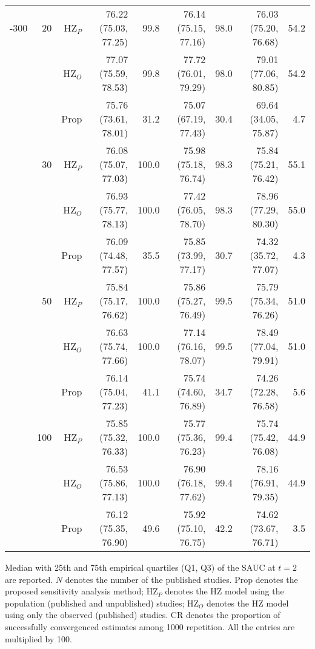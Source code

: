 \begin{table}[!htb]
\begin{threeparttable}
\begin{tabular}[t]{rrrrrrrrr}
\addlinespace
50-300 & 20 & HZ$_P$ & 76.22 (75.03, 77.25) & 99.8 & 76.14 (75.15, 77.16) & 98.0 & 76.03 (75.20, 76.68) & 54.2\\
 &  & HZ$_O$ & 77.07 (75.59, 78.53) & 99.8 & 77.72 (76.01, 79.29) & 98.0 & 79.01 (77.06, 80.85) & 54.2\\
 &  & Prop & 75.76 (73.61, 78.01) & 31.2 & 75.07 (67.19, 77.43) & 30.4 & 69.64 (34.05, 75.87) & 4.7\\
\addlinespace
 & 30 & HZ$_P$ & 76.08 (75.07, 77.03) & 100.0 & 75.98 (75.18, 76.74) & 98.3 & 75.84 (75.21, 76.42) & 55.1\\
 &  & HZ$_O$ & 76.93 (75.77, 78.13) & 100.0 & 77.42 (76.05, 78.70) & 98.3 & 78.96 (77.29, 80.30) & 55.0\\
 &  & Prop & 76.09 (74.48, 77.57) & 35.5 & 75.85 (73.99, 77.17) & 30.7 & 74.32 (35.72, 77.07) & 4.3\\
\addlinespace
 & 50 & HZ$_P$ & 75.84 (75.17, 76.62) & 100.0 & 75.86 (75.27, 76.49) & 99.5 & 75.79 (75.34, 76.26) & 51.0\\
 &  & HZ$_O$ & 76.63 (75.74, 77.66) & 100.0 & 77.14 (76.16, 78.07) & 99.5 & 78.49 (77.04, 79.91) & 51.0\\
 &  & Prop & 76.14 (75.04, 77.23) & 41.1 & 75.74 (74.60, 76.89) & 34.7 & 74.26 (72.28, 76.58) & 5.6\\
\addlinespace
 & 100 & HZ$_P$ & 75.85 (75.32, 76.33) & 100.0 & 75.77 (75.36, 76.23) & 99.4 & 75.74 (75.42, 76.08) & 44.9\\
 &  & HZ$_O$ & 76.53 (75.86, 77.13) & 100.0 & 76.90 (76.18, 77.62) & 99.4 & 78.16 (76.91, 79.35) & 44.9\\
 &  & Prop & 76.12 (75.35, 76.90) & 49.6 & 75.92 (75.10, 76.75) & 42.2 & 74.62 (73.67, 76.71) & 3.5\\
\bottomrule
\end{tabular}
\begin{tablenotes}
\item 
			Median with 25th and 75th empirical quartiles (Q1, Q3) of the SAUC at $t=2$ are reported. 
			$N$ denotes the number of the published studies. 
			Prop denotes the proposed sensitivity analysis method;
			HZ$_P$ denotes the HZ model using the population (published and unpublished) studies; 
			HZ$_O$ denotes the HZ model using only the observed (published) studies.
			CR denotes the proportion of successfully convergenced estimates among 1000 repetition.
			All the entries are multiplied by 100.
\end{tablenotes}
\end{threeparttable}
\end{table}
